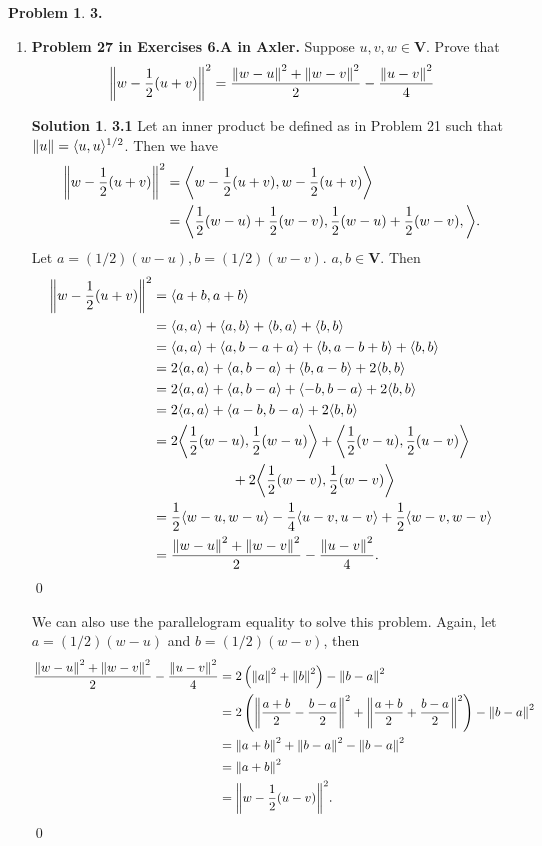 \documentclass{book}
\theoremstyle{definition}
\newtheorem*{prob*}{Problem}
\newtheorem*{sln*}{Solution}
\newcommand{\V}{\mathbf{V}}
\newcommand{\la}{\langle}
\newcommand{\ra}{\rangle}
\begin{document}
\newpage



\begin{prob*}\textbf{3.}
	\begin{enumerate}
		\item \textbf{Problem 27 in Exercises 6.A in Axler.} Suppose $u,v,w \in \V$. Prove that
		\begin{align*}
		\norm{w - \frac{1}{2}(u+v)}^2 = \frac{\norm{w-u}^2 + \norm{w-v}^2}{2} - \frac{\norm{u-v}^2}{4}
		\end{align*}
		
		
		
		\begin{sln*}\textbf{3.1} Let an inner product be defined as in Problem 21 such that $\norm{u} = \la u,u \ra^{1/2}$. Then we have
			\begin{align*}
			\norm{w - \frac{1}{2}(u+v)}^2 
			&= \bigg\la w - \frac{1}{2}(u+v) , w - \frac{1}{2}(u+v) \bigg\ra\\
			&= \bigg\la \frac{1}{2}(w-u) + \frac{1}{2}(w-v), \frac{1}{2}(w-u) + \frac{1}{2}(w-v), \bigg\ra.
			\end{align*}
			Let $a = (1/2)(w-u), b = (1/2)(w-v)$. $a,b\in \V$. Then
			\begin{align*}
			\norm{w - \frac{1}{2}(u+v)}^2
			&= \la a+b, a+b \ra\\
			&= \la a,a \ra + \la a,b \ra + \la b,a \ra + \la b,b \ra\\
			&= \la a,a \ra + \la a,b-a +a \ra + \la b,a - b +b  \ra + \la b,b \ra\\
			&= 2\la a,a \ra + \la a,b-a \ra + \la b,a - b  \ra + 2\la b,b \ra\\
			&= 2\la a,a \ra + \la a,b-a \ra + \la -b,b-a  \ra + 2\la b,b \ra\\
			&= 2\la a,a \ra + \la a-b,b-a \ra + 2\la b,b \ra\\
			&= 2\bigg\la \frac{1}{2}(w-u),\frac{1}{2}(w-u) \bigg\ra + \bigg\la \frac{1}{2}(v-u),\frac{1}{2}(u-v) \bigg\ra \\
			&\hspace{2cm}+ 2\bigg\la \frac{1}{2}(w-v),\frac{1}{2}(w-v) \bigg\ra\\
			&= \frac{1}{2}\la w-u,w-u \ra - \frac{1}{4}\la u-v, u-v  \ra + \frac{1}{2}\la w-v ,w-v\ra\\
			&= \frac{\norm{w-u}^2 + \norm{w-v}^2}{2} - \frac{\norm{u-v}^2}{4}.
			\end{align*} \qed
			
			We can also use the parallelogram equality to solve this problem. Again, let $a = (1/2)(w-u)$ and $b = (1/2)(w-v)$, then
			\begin{align*}
			\frac{\norm{w-u}^2 + \norm{w-v}^2}{2} - \frac{\norm{u-v}^2}{4} 
			&= 2\left(\norm{a}^2 + \norm{b}^2 \right) - \norm{b-a}^2\\
			&= 2\left( \norm{\frac{a+b}{2} - \frac{b-a}{2}}^2 + \norm{\frac{a+b}{2} + \frac{b-a}{2}}^2 \right) - \norm{b-a}^2\\
			&= \norm{a+b}^2 + \norm{b-a}^2 - \norm{b-a}^2\\
			&= \norm{a+b}^2\\
			&= \norm{w - \frac{1}{2}(u-v)}^2. 
			\end{align*}\qed
			

\end{sln*}
\end{enumerate}
\end{prob*}
\end{document}
